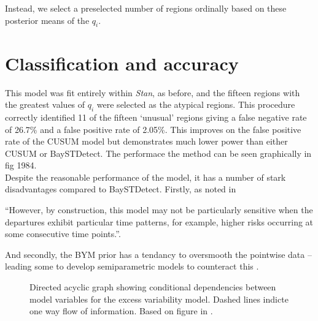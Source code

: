 \documentclass[11pt]{report}
\begin{document}
Instead, we select a preselected number of regions ordinally based on these posterior means of the $q_i$.

\section{Classification and accuracy}

This model was fit entirely within \emph{Stan}, as before, and the fifteen regions with the greatest values of $q_i$ were selected as the atypical regions. This procedure correctly identified 11 of the fifteen `unusual' regions giving a false negative rate of 26.7\% and a false positive rate of 2.05\%. This improves on the false positive rate of the CUSUM model but demonstrates much lower power than either CUSUM or BaySTDetect. The performace the method can be seen graphically in fig 1984. \\

Despite the reasonable performance of the \citet{stability} model, it has a number of stark disadvantages compared to BaySTDetect. Firstly, as noted in \citet{baystdetect}
\begin{displayquote}
``However, by construction, this model may not be particularly sensitive when the departures exhibit particular time patterns, for example, higher risks occurring at some consecutive time points.''.
\end{displayquote}

And secondly, the BYM prior has a tendancy to oversmooth the pointwise data -- leading some to develop semiparametric models to counteract this \citep{best2005comparison}.

\begin{figure}
\centering
{}
\label{fig:baystdetect}
\caption{Directed acyclic graph showing conditional dependencies between model variables for the excess variability model. Dashed lines indicte one way flow of information. Based on figure in \citet{baystdetect}.}
\end{figure}
\end{document}
